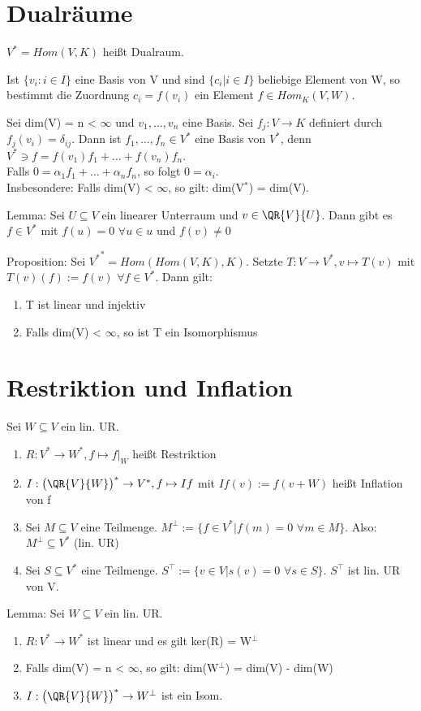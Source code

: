 \section{Dualräume}
$V^* = Hom(V, K)$ heißt Dualraum.
\begin{compactitem}
\item Ist $\{ v_i : i \in I \}$ eine Basis von V und sind $\{ c_i | i \in I \}$ beliebige Element von W, so bestimmt die Zuordnung $c_i = f(v_i)$ ein Element $f \in Hom_K(V,W)$.
\item Sei dim(V) = n < $\infty$ und $v_1, …, v_n$ eine Basis. Sei $f_j: V \to K$ definiert durch $f_j(v_i) = \delta_{ij}$. Dann ist $f_1, …, f_n \in V^*$ eine Basis von $V^*$, denn $V^* \ni f = f(v_1)f_1 + … + f(v_n)f_n$.\\
Falls $0 = \alpha_1 f_1 + … + \alpha_n f_n$, so folgt $0 = \alpha_i$.\\
Insbesondere: Falls dim(V) < $\infty$, so gilt: dim(V$^*$) = dim(V).
\item Lemma: Sei $U \subseteq V$ ein linearer Unterraum und $v \in \QR{V}{U}$. 
Dann gibt es $f \in V^*$ mit $f(u) = 0$ $\forall u \in u$ und $f(v) \neq 0$
\item Proposition: Sei ${V^*}^* = Hom(Hom(V,K), K)$. Setzte $T: V \to V^*, v \mapsto T(v)$ mit $T(v)(f) := f(v)$ $\forall f \in V^*$. Dann gilt:
\begin{enumerate}
\item T ist linear und injektiv
\item Falls dim(V) < $\infty$, so ist T ein Isomorphismus
\end{enumerate}
\end{compactitem}

\section{Restriktion und Inflation}
Sei $W \subseteq V$ ein lin. UR.
\begin{enumerate}
\item $R: V^* \to W^*, f \mapsto f|_W$ heißt Restriktion
\item $I: \big(\QR{V}{W}\big)^* \to V^*, f \mapsto If$ mit $If(v) := f(v + W)$ heißt Inflation von f
\item Sei $M \subseteq V$ eine Teilmenge. $M^\perp := \{ f \in V^* | f(m) = 0$ $\forall m \in M \}$. Also: $M^\perp \subseteq V^*$ (lin. UR)
\item Sei $S \subseteq V^*$ eine Teilmenge. $S^\top := \{ v \in V | s(v) = 0$ $\forall s \in S \}$. $S^\top$ ist lin. UR von V.
\end{enumerate}
Lemma: Sei $W \subseteq V$ ein lin. UR.
\begin{enumerate}
\item $R: V^* \to W^*$ ist linear und es gilt ker(R) = W$^\perp$
\item Falls dim(V) = n < $\infty$, so gilt: dim(W$^\perp$) = dim(V) - dim(W)
\item $I: \big(\QR{V}{W}\big)^* \to W^\perp$ ist ein Isom.
\end{enumerate}

